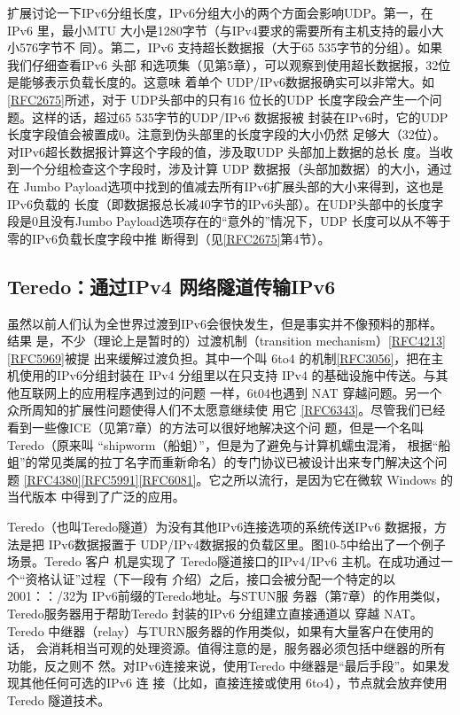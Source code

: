 扩展讨论一下IPv6分组长度，IPv6分组大小的两个方面会影响UDP。第一，在IPv6
里，最小MTU 大小是1280字节（与IPv4要求的需要所有主机支持的最小大小576字节不
同）。第二，IPv6 支持超长数据报（大于65 535字节的分组）。如果我们仔细查看IPv6 头部
和选项集（见第5章），可以观察到使用超长数据报，32位是能够表示负载长度的。这意味
着单个 UDP/IPv6数据报确实可以非常大。如\href{https://www.rfc-editor.org/rfc/rfc2675}{[RFC2675]}所述，对于 UDP头部中的只有16
位长的UDP 长度字段会产生一个问题。这样的话，超过65 535字节的UDP/IPv6 数据报被
封装在IPv6时，它的UDP 长度字段值会被置成0。注意到伪头部里的长度字段的大小仍然
足够大（32位）。对IPv6超长数据报计算这个字段的值，涉及取UDP 头部加上数据的总长
度。当收到一个分组检查这个字段时，涉及计算 UDP 数据报（头部加数据）的大小，通过在
Jumbo Payload选项中找到的值减去所有IPv6扩展头部的大小来得到，这也是IPv6负载的
长度（即数据报总长减40字节的IPv6头部）。在UDP头部中的长度字段是0且没有Jumbo
Payload选项存在的“意外的”情况下，UDP 长度可以从不等于零的IPv6负载长度字段中推
断得到（见\href{https://www.rfc-editor.org/rfc/rfc2675}{[RFC2675]}第4节）。

\subsection{Teredo：通过IPv4 网络隧道传输IPv6}
虽然以前人们认为全世界过渡到IPv6会很快发生，但是事实并不像预料的那样。结果
是，不少（理论上是暂时的）过渡机制（transition mechanism）\href{https://www.rfc-editor.org/rfc/rfc4213}{[RFC4213]}\href{https://www.rfc-editor.org/rfc/rfc5969}{[RFC5969]}被提
出来缓解过渡负担。其中一个叫 6to4 的机制\href{https://www.rfc-editor.org/rfc/rfc3056}{[RFC3056]}，把在主机使用的IPv6分组封装在
IPv4 分组里以在只支持 IPv4 的基础设施中传送。与其他互联网上的应用程序遇到过的问题
一样，6t04也遇到 NAT 穿越问题。另一个众所周知的扩展性问题使得人们不太愿意继续使
用它 \href{https://www.rfc-editor.org/rfc/rfc6343}{[RFC6343]}。尽管我们已经看到一些像ICE（见第7章）的方法可以很好地解决这个问
题，但是一个名叫 Teredo（原来叫 “shipworm（船蛆）”，但是为了避免与计算机蠕虫混淆，
根据“船蛆”的常见类属的拉丁名字而重新命名）的专门协议已被设计出来专门解决这个问
题 \href{https://www.rfc-editor.org/rfc/rfc4380}{[RFC4380]}\href{https://www.rfc-editor.org/rfc/rfc5991}{[RFC5991]}\href{https://www.rfc-editor.org/rfc/rfc6081}{[RFC6081]}。它之所以流行，是因为它在微软 Windows 的当代版本
中得到了广泛的应用。

Teredo（也叫Teredo隧道）为没有其他IPv6连接选项的系统传送IPv6 数据报，方法是把
IPv6数据报置于 UDP/IPv4数据报的负载区里。图10-5中给出了一个例子场景。Teredo 客户
机是实现了 Teredo隧道接口的IPv4/IPv6 主机。在成功通过一个“资格认证”过程（下一段有
介绍）之后，接口会被分配一个特定的以2001：：/32为 IPv6前缀的Teredo地址。与STUN服
务器（第7章）的作用类似，Teredo服务器用于帮助Teredo 封装的IPv6 分组建立直接通道以
穿越 NAT。Teredo 中继器（relay）与TURN服务器的作用类似，如果有大量客户在使用的话，
会消耗相当可观的处理资源。值得注意的是，服务器必须包括中继器的所有功能，反之则不
然。对IPv6连接来说，使用Teredo 中继器是“最后手段”。如果发现其他任何可选的IPv6 连
接（比如，直接连接或使用 6to4），节点就会放弃使用 Teredo 隧道技术。

